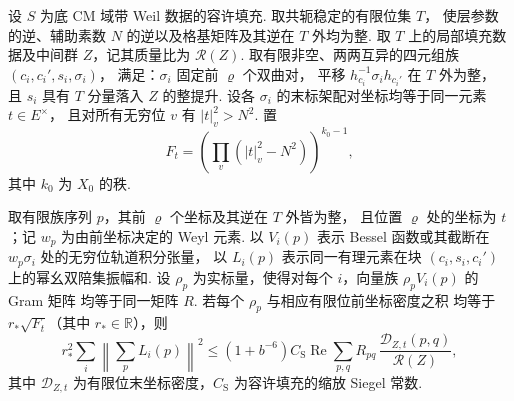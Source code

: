 \begin{lemma}
\label{lem:b-siegel-last-entry}
\emitthmsource
设 $S$ 为底 CM 域带 Weil 数据的容许填充. 取共轭稳定的有限位集 $T$，
使层参数的逆、辅助素数 $N$ 的逆以及格基矩阵及其逆在 $T$ 外均为整.
取 $T$ 上的局部填充数据及中间群 $Z$，记其质量比为 $\mathcal R(Z)$.
取有限非空、两两互异的四元组族 $(c_i,c_i',s_i,\sigma_i)$，
满足：$\sigma_i$ 固定前 $\varrho$ 个双曲对，
平移 $h_{c_i}^{-1}\sigma_i h_{c_i'}$ 在 $T$ 外为整，
且 $s_i$ 具有 $T$ 分量落入 $Z$ 的整提升.
设各 $\sigma_i$ 的末标架配对坐标均等于同一元素 $t\in E^\times$，
且对所有无穷位 $v$ 有 $|t|_v^2>N^2$. 置
\[
 F_t=\left(\prod_v (|t|_v^2-N^2)\right)^{k_0-1},
\]
其中 $k_0$ 为 $X_0$ 的秩.

取有限族序列 $p$，其前 $\varrho$ 个坐标及其逆在 $T$ 外皆为整，
且位置 $\varrho$ 处的坐标为 $t$；记 $w_p$ 为由前坐标决定的 Weyl 元素.
以 $V_i(p)$ 表示 Bessel 函数或其截断在 $w_p\sigma_i$ 处的无穷位轨道积分张量，
以 $L_i(p)$ 表示同一有理元素在块 $(c_i,s_i,c_i')$ 上的幂幺双陪集振幅和.
设 $\rho_p$ 为实标量，使得对每个 $i$，向量族 $\rho_pV_i(p)$ 的 Gram 矩阵
均等于同一矩阵 $R$. 若每个 $\rho_p$ 与相应有限位前坐标密度之积
均等于 $r_*\sqrt{F_t}$（其中 $r_*\in\mathbb R$），则
\[
 r_*^2\sum_i\left\|\sum_p L_i(p)\right\|^2
 \le (1+b^{-6})C_{\mathrm S}
       \operatorname{Re}\sum_{p,q}
           R_{pq}\,\frac{\mathcal D_{Z,t}(p,q)}{\mathcal R(Z)},
\]
其中 $\mathcal D_{Z,t}$ 为有限位末坐标密度，$C_{\mathrm S}$ 为容许填充的缩放 Siegel 常数.
\end{lemma}
